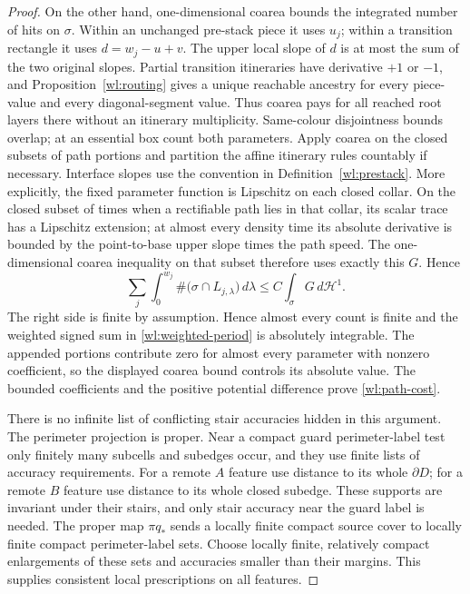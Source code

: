 \begin{proof}
On the other hand, one-dimensional coarea bounds the integrated
number of hits on $\sigma$.  Within an unchanged pre-stack piece it
uses $u_j$; within a transition rectangle it uses
$d=w_j-u+v$.  The upper local slope of $d$ is at most the sum of the
two original slopes.  Partial transition itineraries have derivative
$+1$ or $-1$, and Proposition~\ref{wl:routing} gives a unique reachable
ancestry for every piece-value and every diagonal-segment value.
Thus coarea pays for all reached root layers there without an
itinerary multiplicity.  Same-colour disjointness bounds overlap;
at an essential box count both parameters.  Apply coarea on the
closed subsets of path portions and partition the affine itinerary
rules countably if necessary.  Interface slopes use the convention in
Definition~\ref{wl:prestack}.  More explicitly, the fixed parameter
function is Lipschitz on each closed collar.  On the closed subset
of times when a rectifiable path lies in that collar, its scalar
trace has a Lipschitz extension; at almost every density time its
absolute derivative is bounded by the point-to-base upper slope
times the path speed.  The one-dimensional coarea inequality on
that subset therefore uses exactly this $G$.  Hence
\[
 \sum_j\int_0^{w_j}
       \#\bigl(\sigma\cap L_{j,\lambda}\bigr)\,d\lambda
       \leq C\int_\sigma G\,d\mathcal H^1.
\]
The right side is finite by assumption.  Hence almost every count
is finite and the weighted signed sum in \eqref{wl:weighted-period} is absolutely
integrable.  The appended portions contribute zero for almost every
parameter with nonzero coefficient, so the displayed coarea bound
controls its absolute value.  The bounded coefficients and the
positive potential difference prove \eqref{wl:path-cost}.

There is no infinite list of conflicting stair accuracies hidden in
this argument.  The perimeter projection is proper.  Near a compact
guard perimeter-label test only finitely many subcells and subedges
occur, and they use finite lists of accuracy requirements.  For a remote $A$
feature use distance to its whole $\partial D$; for a remote $B$
feature use distance to its whole closed subedge.  These supports are
invariant under their stairs, and only stair accuracy near the guard
label is needed.  The proper map $\pi q_*$ sends a locally finite
compact source cover to locally finite compact perimeter-label sets.
Choose locally finite, relatively compact enlargements of these sets
and accuracies smaller than their margins.  This supplies consistent
local prescriptions on all features.
\end{proof}

